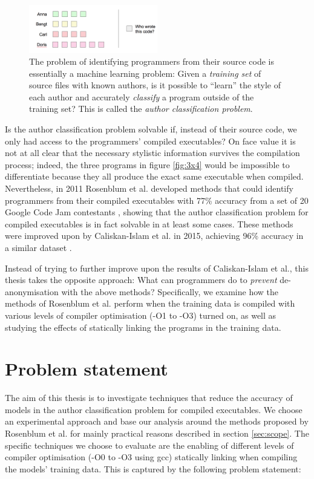 \documentclass[a4paper,11pt]{kth-mag}
\begin{document}
\begin{figure}[!htb]
    \centering
    \includegraphics[width=0.5\textwidth]{id-ml}
    \caption{ The problem of identifying programmers from their source code is
    essentially a machine learning problem: Given a \emph{training set} of
    source files with known authors, is it possible to ``learn'' the style of
    each author and accurately \emph{classify} a program outside of the
    training set? This is called the \emph{author classification problem}. }
    \label{fig:id-ml}
\end{figure}

Is the author classification problem solvable if, instead of their source code,
we only had access to the programmers' compiled executables? On face value it
is not at all clear that the necessary stylistic information survives the
compilation process; indeed, the three programs in figure \ref{fig:3x4} would
be impossible to differentiate because they all produce the exact same
executable when compiled. Nevertheless, in 2011 Rosenblum et al. developed
methods that could identify programmers from their compiled executables 
with 77\% accuracy from a set of 20 Google Code Jam contestants
\parencite{rosenblum2011wrote}, showing that the author classification problem
for compiled executables is in fact solvable in at least some cases. These
methods were improved upon by Caliskan-Islam et al. in 2015, achieving 96\%
accuracy in a similar dataset \parencite{caliskan2015coding}. 

Instead of trying to further improve upon the results of Caliskan-Islam et al.,
this thesis takes the opposite approach: What can programmers do to
\emph{prevent} de-anonymisation with the above methods? Specifically, we
examine how the methods of Rosenblum et al. \parencite{rosenblum2011wrote}
perform when the training data is compiled with various levels of compiler
optimisation (-O1 to -O3) turned on, as well as studying the effects of
statically linking the programs in the training data.

\section{Problem statement}
The aim of this thesis is to investigate techniques that reduce the accuracy of
models in the author classification problem for compiled executables. We choose
an experimental approach and base our analysis around the methods proposed by
Rosenblum et al. \parencite{rosenblum2011wrote} for mainly practical reasons
described in section \ref{sec:scope}. The specific techniques we choose to
evaluate are the enabling of different levels of compiler optimisation (-O0 to
-O3 using gcc) statically linking when compiling the models' training
data. This is captured by the following problem statement: 
\end{document}
